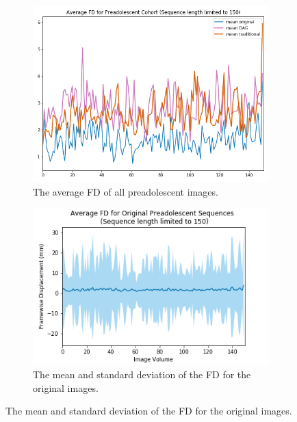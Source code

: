 \begin{figure}[ht]
	\centering
	\begin{subfigure}{0.45\textwidth}
		\centering
		\includegraphics[width=1\textwidth]{6/figures/pread_fd_all_150_avg.png}
		\caption{The average FD of all preadolescent images.}
	\end{subfigure}%
	\vspace{0.05\textwidth}
	\begin{subfigure}{0.45\textwidth}
		\centering
		\includegraphics[width=1\textwidth]{6/figures/pread-bold-fd-150.png}
		\caption{The mean and standard deviation of the FD for the original images.}
	\end{subfigure}
	

\end{figure}
